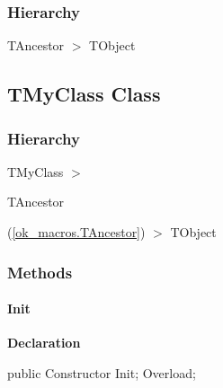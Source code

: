 \documentclass{report}
\newif\ifpdf
\begin{document}
\subsubsection*{\large{\textbf{Hierarchy}}\normalsize\hspace{1ex}\hfill}
TAncestor {$>$} TObject
\ifpdf
\subsection*{\large{\textbf{TMyClass Class}}\normalsize\hspace{1ex}\hrulefill}
\else
\subsection*{TMyClass Class}
\fi
\label{ok_macros.TMyClass}
\subsubsection*{\large{\textbf{Hierarchy}}\normalsize\hspace{1ex}\hfill}
TMyClass {$>$} \begin{ttfamily}TAncestor\end{ttfamily}(\ref{ok_macros.TAncestor}) {$>$} 
TObject
\subsubsection*{\large{\textbf{Methods}}\normalsize\hspace{1ex}\hfill}
\paragraph*{Init}\hspace*{\fill}

\label{ok_macros.TMyClass-Init}
\begin{list}{}{
\setlength{\itemindent}{0cm}
\setlength{\listparindent}{0cm}
\setlength{\leftmargin}{\evensidemargin}
\addtolength{\leftmargin}{\tmplength}
\settowidth{\labelsep}{X}
\addtolength{\leftmargin}{\labelsep}
\setlength{\labelwidth}{\tmplength}
}
\item[\textbf{Declaration}\hfill]
\ifpdf
\begin{flushleft}
\fi
\begin{ttfamily}
public Constructor Init; Overload;\end{ttfamily}

\ifpdf
\end{flushleft}
\fi

\end{list}
\end{document}
